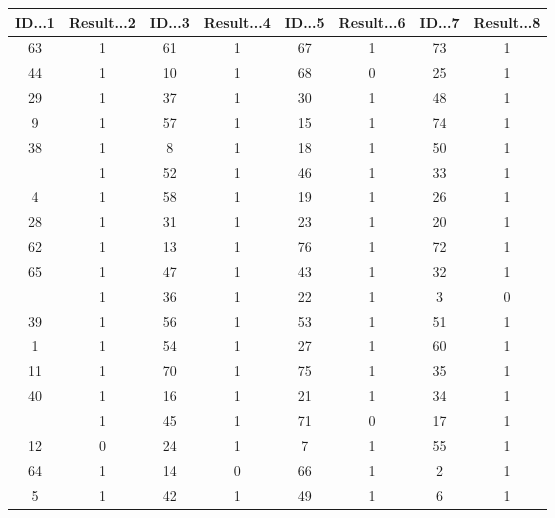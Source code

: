 \documentclass[
]{article}
\begin{document}
\begin{table}
\centering\begingroup\fontsize{10}{12}\selectfont

\begin{tabular}{cccccccc}
\toprule
ID...1 & Result...2 & ID...3 & Result...4 & ID...5 & Result...6 & ID...7 & Result...8\\
\midrule
63 & 1 & 61 & 1 & 67 & 1 & 73 & 1\\
44 & 1 & 10 & 1 & 68 & 0 & 25 & 1\\
29 & 1 & 37 & 1 & 30 & 1 & 48 & 1\\
9 & 1 & 57 & 1 & 15 & 1 & 74 & 1\\
38 & 1 & 8 & 1 & 18 & 1 & 50 & 1\\
\addlinespace
59 & 1 & 52 & 1 & 46 & 1 & 33 & 1\\
4 & 1 & 58 & 1 & 19 & 1 & 26 & 1\\
28 & 1 & 31 & 1 & 23 & 1 & 20 & 1\\
62 & 1 & 13 & 1 & 76 & 1 & 72 & 1\\
65 & 1 & 47 & 1 & 43 & 1 & 32 & 1\\
\addlinespace
69 & 1 & 36 & 1 & 22 & 1 & 3 & 0\\
39 & 1 & 56 & 1 & 53 & 1 & 51 & 1\\
1 & 1 & 54 & 1 & 27 & 1 & 60 & 1\\
11 & 1 & 70 & 1 & 75 & 1 & 35 & 1\\
40 & 1 & 16 & 1 & 21 & 1 & 34 & 1\\
\addlinespace
41 & 1 & 45 & 1 & 71 & 0 & 17 & 1\\
12 & 0 & 24 & 1 & 7 & 1 & 55 & 1\\
64 & 1 & 14 & 0 & 66 & 1 & 2 & 1\\
5 & 1 & 42 & 1 & 49 & 1 & 6 & 1\\
\bottomrule
\end{tabular}
\endgroup{}
\end{table}
\end{document}
